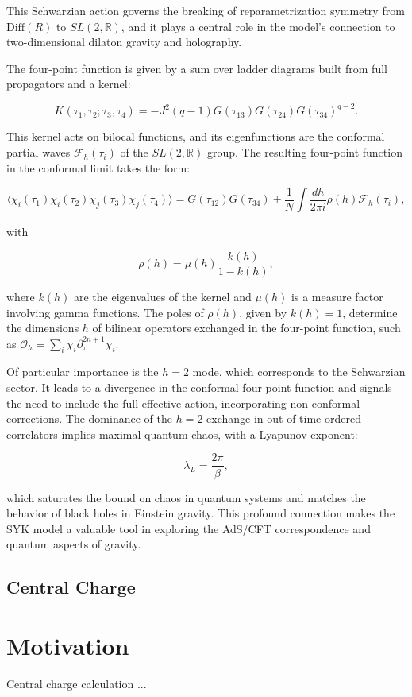 This Schwarzian action governs the breaking of reparametrization symmetry from $\text{Diff}(R)$ to $SL(2, \mathbb{R})$, and it plays a central role in the model's connection to two-dimensional dilaton gravity and holography.

The four-point function is given by a sum over ladder diagrams built from full propagators and a kernel:

$$
K(\tau_1, \tau_2; \tau_3, \tau_4) = -J^2 (q-1) G(\tau_{13}) G(\tau_{24}) G(\tau_{34})^{q-2}.
$$

This kernel acts on bilocal functions, and its eigenfunctions are the conformal partial waves $\mathcal{F}_h(\tau_i)$ of the $SL(2, \mathbb{R})$ group. The resulting four-point function in the conformal limit takes the form:

$$
\langle \chi_i(\tau_1) \chi_i(\tau_2) \chi_j(\tau_3) \chi_j(\tau_4) \rangle = G(\tau_{12})G(\tau_{34}) + \frac{1}{N} \int \frac{dh}{2\pi i} \rho(h) \mathcal{F}_h(\tau_i),
$$

with

$$
\rho(h) = \mu(h) \frac{k(h)}{1 - k(h)},
$$

where $k(h)$ are the eigenvalues of the kernel and $\mu(h)$ is a measure factor involving gamma functions. The poles of $\rho(h)$, given by $k(h) = 1$, determine the dimensions $h$ of bilinear operators exchanged in the four-point function, such as $\mathcal{O}_h = \sum_i \chi_i \partial_\tau^{2n+1} \chi_i$.

Of particular importance is the $h = 2$ mode, which corresponds to the Schwarzian sector. It leads to a divergence in the conformal four-point function and signals the need to include the full effective action, incorporating non-conformal corrections. The dominance of the $h = 2$ exchange in out-of-time-ordered correlators implies maximal quantum chaos, with a Lyapunov exponent:

$$
\lambda_L = \frac{2\pi}{\beta},
$$

which saturates the bound on chaos in quantum systems and matches the behavior of black holes in Einstein gravity. This profound connection makes the SYK model a valuable tool in exploring the AdS/CFT correspondence and quantum aspects of gravity.

\subsection{Central Charge}


\section{Motivation}

{\color{red} Central charge calculation ...}

%
%
